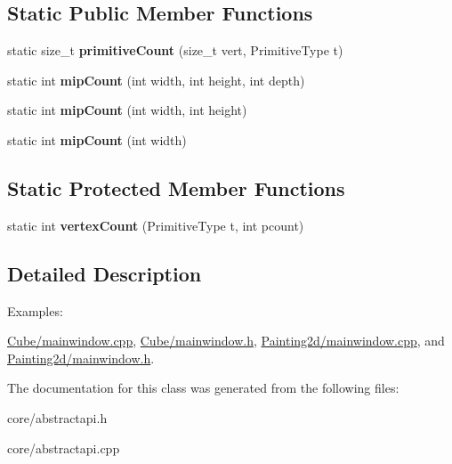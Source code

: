 \subsection*{Static Public Member Functions}
\begin{DoxyCompactItemize}
\item 
\hypertarget{class_tempest_1_1_abstract_a_p_i_a8ed8829adee6a2d8288800b96e03e957}{static size\+\_\+t {\bfseries primitive\+Count} (size\+\_\+t vert, Primitive\+Type t)}\label{class_tempest_1_1_abstract_a_p_i_a8ed8829adee6a2d8288800b96e03e957}

\item 
\hypertarget{class_tempest_1_1_abstract_a_p_i_a59a30e599f1401066525ba307725a35c}{static int {\bfseries mip\+Count} (int width, int height, int depth)}\label{class_tempest_1_1_abstract_a_p_i_a59a30e599f1401066525ba307725a35c}

\item 
\hypertarget{class_tempest_1_1_abstract_a_p_i_a838e14dd3f0889fff2d19dd60dc7f273}{static int {\bfseries mip\+Count} (int width, int height)}\label{class_tempest_1_1_abstract_a_p_i_a838e14dd3f0889fff2d19dd60dc7f273}

\item 
\hypertarget{class_tempest_1_1_abstract_a_p_i_a6df9a3a81de6826fbe00a27dd67156a8}{static int {\bfseries mip\+Count} (int width)}\label{class_tempest_1_1_abstract_a_p_i_a6df9a3a81de6826fbe00a27dd67156a8}

\end{DoxyCompactItemize}
\subsection*{Static Protected Member Functions}
\begin{DoxyCompactItemize}
\item 
\hypertarget{class_tempest_1_1_abstract_a_p_i_ac9197dbb6415bfe44eefaaedc3cb3ddf}{static int {\bfseries vertex\+Count} (Primitive\+Type t, int pcount)}\label{class_tempest_1_1_abstract_a_p_i_ac9197dbb6415bfe44eefaaedc3cb3ddf}

\end{DoxyCompactItemize}


\subsection{Detailed Description}
\begin{Desc}
\item[Examples\+: ]\par
\hyperlink{_cube_2mainwindow_8cpp-example}{Cube/mainwindow.\+cpp}, \hyperlink{_cube_2mainwindow_8h-example}{Cube/mainwindow.\+h}, \hyperlink{_painting2d_2mainwindow_8cpp-example}{Painting2d/mainwindow.\+cpp}, and \hyperlink{_painting2d_2mainwindow_8h-example}{Painting2d/mainwindow.\+h}.\end{Desc}


The documentation for this class was generated from the following files\+:\begin{DoxyCompactItemize}
\item 
core/abstractapi.\+h\item 
core/abstractapi.\+cpp\end{DoxyCompactItemize}
